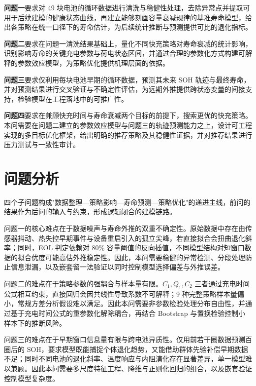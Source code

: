 \documentclass[12pt,a4paper]{article}
\begin{document}
\textbf{问题一}要求对 49 块电池的循环数据进行清洗与稳健性处理，去除异常点并提取可用于后续建模的健康状态曲线，再建立能够刻画容量衰减规律的基准寿命模型，给出各策略在统一口径下的寿命估计，为后续统计推断与预测提供可比的退化指标。

\textbf{问题二}要求在问题一清洗结果基础上，量化不同快充策略对寿命衰减的统计影响，识别影响寿命的关键充电参数与荷电状态区间，并通过合理的参数化方式构建可解释的参数效应模型，为策略优化提供机理层面的依据。

\textbf{问题三}要求仅利用每块电池早期的循环数据，预测其未来 SOH 轨迹与最终寿命，并对预测结果进行交叉验证与不确定性评估，为远期外推提供跨状态变量的间接支持，检验模型在工程落地中的可推广性。

\textbf{问题四}要求在兼顾快充时间与寿命衰减两个目标的前提下，搜索更优的快充策略。本问需要在问题二建立的参数效应模型与问题三的轨迹预测能力之上，设计可工程实现的多目标优化框架，给出明确的推荐策略及其稳健性证据，并对推荐结果进行压力测试与一致性审计。

\section{问题分析}

四个子问题构成"数据整理—策略影响—寿命预测—策略优化"的递进主线，前问的结果作为后问的输入与约束，形成逻辑闭合的建模链路。

问题一的核心难点在于数据噪声与寿命外推的双重不确定性。原始数据中存在由传感器抖动、热失控早期事件与设备重启引入的孤立尖峰，若直接拟合会扭曲退化斜率；同时，EOL 判定依赖对 80\% 容量阈值的反向插值，不同模型结构对短窗口数据的拟合优度可能高估外推稳定性。因此，本问需要稳健的异常检测、分段处理防止信息泄漏，以及嵌套留一法验证以同时控制模型选择偏差与外推误差。

问题二的难点在于策略参数的强耦合与样本量有限。$C_1,Q_1,C_2$ 三者通过充电时间公式相互约束，直接回归会因共线性导致系数不可解释；9 种完整策略样本量偏小，常规方差分析假设难以满足。因此本问需要非参数检验处理分布自由性，并通过基于充电时间公式的重参数化解除耦合，再结合 Bootstrap 与置换检验控制小样本下的推断风险。

问题三的难点在于早期窗口信息量有限与跨电池异质性。仅用前若干圈数据预测百圈后的 SOH，要求模型既能捕捉个体退化趋势，又能借助群体先验补偿早期数据不足；同时不同电池的退化斜率、温度响应与内阻演化存在显著差异，单一模型难以兼顾。因此本问需要多尺度特征工程、降维与正则化回归的组合，以及嵌套验证控制模型复杂度。
\end{document}
